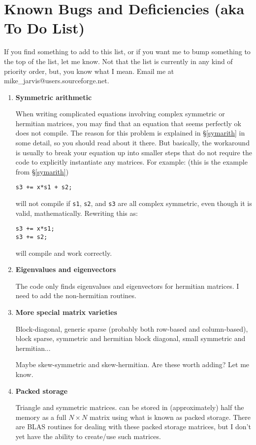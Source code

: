 \documentclass[twoside,letterpaper,11pt]{article}
\makeatletter
\renewcommand{\tt}[1]{{\texttt {#1}}}
\newcommand{\myemail}{mike\_jarvis@users.sourceforge.net}
\makeatother
\begin{document}
\newpage
\section{Known Bugs and Deficiencies (aka To Do List)}

If you find something to add to this list, or if you want me to bump something
to the top of the list, let me know.  Not that the list is currently in any kind of 
priority order, but, you know what I mean.  Email me at \myemail.

\begin{enumerate}
\item
\textbf{Symmetric arithmetic}

When writing complicated equations involving complex symmetric or hermitian matrices, 
you may find that an equation that seems perfectly ok does not compile.
The reason for this problem is explained in \S\ref{symarith} in some detail, 
so you should read about it there.  But basically, the workaround is usually
to break your equation up into smaller steps that do not require the code to 
explicitly instantiate any matrices.  For example: (this is the example from \S\ref{symarith})
\begin{verbatim}
s3 += x*s1 + s2;
\end{verbatim}
will not compile if \tt{s1}, \tt{s2}, and \tt{s3} are all complex symmetric, even though it is 
valid, mathematically.  Rewriting this as:
\begin{verbatim}
s3 += x*s1;
s3 += s2;
\end{verbatim}
will compile and work correctly.

\item
\textbf{Eigenvalues and eigenvectors}

The code only finds eigenvalues and eigenvectors for hermitian matrices.
I need to add the non-hermitian routines.

\item
\textbf{More special matrix varieties}

Block-diagonal, generic sparse (probably both
row-based and column-based), block sparse, symmetric and hermitian block
diagonal, small symmetric and hermitian...

Maybe skew-symmetric and skew-hermitian.  Are these worth adding?  Let me know.

\item
\textbf{Packed storage}

Triangle and symmetric matrices. can be stored in (approximately) half the 
memory as a full $N \times N$ matrix using what is known as packed storage.  
There are BLAS routines for dealing with
these packed storage matrices, but I don't yet have the ability to 
create/use such matrices.


\end{enumerate}
\end{document}
